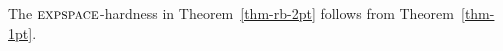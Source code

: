 The $\textsc{expspace}$-hardness in Theorem~\ref{thm-rb-2pt} follows from Theorem~\ref{thm-1pt}.

%




%
%
